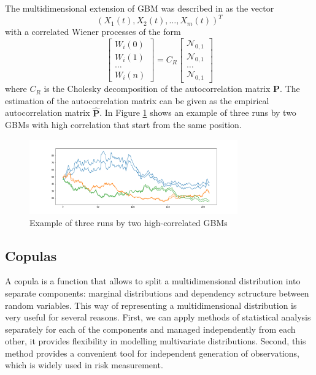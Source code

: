 \documentclass{article}
\begin{document}
The multidimensional extension of GBM was described in \cite{sabino2007monte} as the vector $$(X_1(t), X_2(t), \dots, X_m(t))^T$$ with a correlated Wiener processes of the form
\begin{equation*}
\begin{bmatrix}
    W_i(0)\\
    W_i(1)\\
    \dots \\
    W_i(n)
\end{bmatrix} = C_R \begin{bmatrix}
    \mathcal{N}_{0, 1}\\
    \mathcal{N}_{0, 1}\\
    \dots\\
    \mathcal{N}_{0, 1}
\end{bmatrix}
\end{equation*}
where $C_R$ is the Cholesky decomposition of the autocorrelation matrix $\mathbf P$. The estimation of the autocorrelation matrix can be given as the empirical autocorrelation matrix $\hat {\mathbf P}$. In Figure \ref{fig:gbm1} shows an example of three runs by two GBMs with high correlation that start from the same position.

\begin{figure}[h]
    \centering
    \includegraphics[width=0.8\textwidth]{pics/gbm.png}
    \caption{Example of three runs by two high-correlated GBMs}
    \label{fig:gbm1}
\end{figure}

\subsection{Copulas}
\label{section:copulas}

A copula is a function that allows to split a multidimensional distribution into separate components: marginal distributions and dependency sctructure between random variables. This way of representing a multidimensional distribution is very useful for several reasons. First, we can apply methods of statistical analysis separately for each of the components and managed independently from each other, it provides flexibility in modelling multivariate distributions. Second, this method provides a convenient tool for independent generation of observations, which is widely used in risk measurement.
\end{document}
